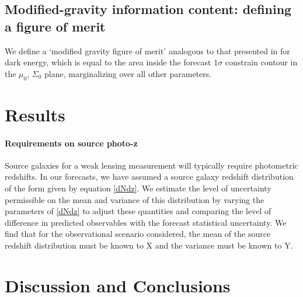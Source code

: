 \documentclass[onecolumn,amsmath,aps,fleqn, superscriptaddress]{revtex4}
\begin{document}

\subsection{Modified-gravity information content: defining a figure of merit}
We define a `modified gravity figure of merit' analogous to that presented in \cite{Albrecht2006} for dark energy, which is equal to the area inside the forecast $1\sigma$ constrain contour in the $\mu_0$, $\Sigma_0$ plane, marginalizing over all other parameters. 


\section{Results}

\paragraph{Requirements on source photo-z}
Source galaxies for a weak lensing measurement will typically require photometric redshifts. In our forecasts, we have assumed a source galaxy redshift distribution of the form given by equation \ref{dNdz}. We estimate the level of uncertainty permissible on the mean and variance of this distribution by varying the parameters of \ref{dNdz} to adjust these quantities and comparing the level of difference in predicted observables with the forecast statistical uncertainty. We find that for the observational scenario considered, the mean of the source redshift distribution must be known to X and the variance must be known to Y.

\section{Discussion and Conclusions}






\end{document}
